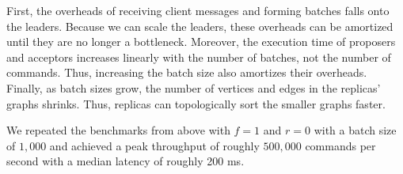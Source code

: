 First, the overheads of receiving client messages and forming batches falls
onto the leaders. Because we can scale the leaders, these overheads can be
amortized until they are no longer a bottleneck. Moreover, the execution time
of proposers and acceptors increases linearly with the number of batches, not
the number of commands. Thus, increasing the batch size also amortizes their
overheads. Finally, as batch sizes grow, the number of vertices and edges in
the replicas' graphs shrinks. Thus, replicas can topologically sort the smaller
graphs faster.

We repeated the benchmarks from above with $f=1$ and $r=0$ with a batch size of
$1,000$ and achieved a peak throughput of roughly $500,000$ commands per second
with a median latency of roughly 200 ms.

